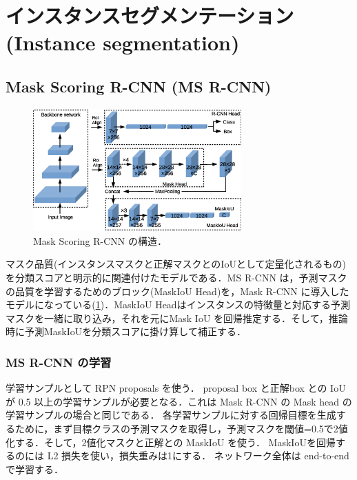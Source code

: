 \documentclass[originalpaper]{jsaiart}     %
\begin{document}
\section{インスタンスセグメンテーション(Instance segmentation)}
\subsection{Mask Scoring R-CNN (MS R-CNN)}
\begin{figure}[tb]
    \begin{center}
        \includegraphics[width=8cm,clip]{fig/archi_ms_rcnn.eps}
    \end{center}
    \caption{ Mask Scoring R-CNN の構造．}
    \label{fig:archi_ms_rcnn}
\end{figure}
マスク品質(インスタンスマスクと正解マスクとのIoUとして定量化されるもの)を分類スコアと明示的に関連付けたモデルである\cite{HHGHW19}．MS R-CNN は，予測マスクの品質を学習するためのブロック(MaskIoU Head)を，Mask R-CNN\cite{HGDG17} に導入したモデルになっている(\ref{fig:archi_ms_rcnn})．MaskIoU Headはインスタンスの特徴量と対応する予測マスクを一緒に取り込み，それを元にMask IoU を回帰推定する．そして，推論時に予測MaskIoUを分類スコアに掛け算して補正する．
\subsubsection{MS R-CNN の学習}
学習サンプルとして RPN proposals を使う．
proposal box と正解box との IoU が 0.5 以上の学習サンプルが必要となる．これは Mask R-CNN の Mask head の学習サンプルの場合と同じである．
各学習サンプルに対する回帰目標を生成するために，まず目標クラスの予測マスクを取得し，予測マスクを閾値=0.5で2値化する．そして，2値化マスクと正解との MaskIoU を使う．
MaskIoUを回帰するのには L2 損失を使い，損失重みは1にする．
ネットワーク全体は end-to-end で学習する．
\end{document}
